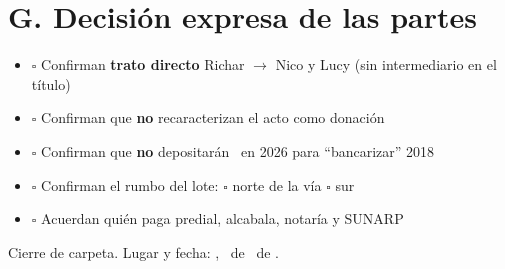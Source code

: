 \documentclass[12pt,a4paper]{article}
\begin{document}
\section*{G. Decisión expresa de las partes}
\begin{itemize}[leftmargin=0.9cm]
\item $\square$ Confirman \textbf{trato directo} Richar $\rightarrow$ Nico y Lucy (sin intermediario en el título)
\item $\square$ Confirman que \textbf{no} recaracterizan el acto como donación
\item $\square$ Confirman que \textbf{no} depositarán \MontoPago\ en 2026 para ``bancarizar'' 2018
\item $\square$ Confirman el rumbo del lote: \quad $\square$ norte de la vía \quad $\square$ sur
\item $\square$ Acuerdan quién paga predial, alcabala, notaría y SUNARP
\end{itemize}

\vspace{0.4em}
\noindent Cierre de carpeta. Lugar y fecha: \LugarOtorgamiento, \DiaOtorgamiento\ de \MesOtorgamiento\ de \AnioOtorgamiento.

\vspace{0.2em}
\end{document}
